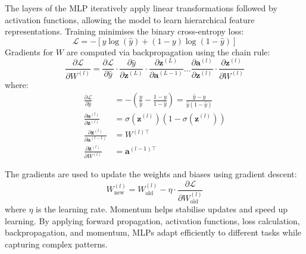 The layers of the MLP iteratively apply linear transformations followed by activation functions, allowing the model to learn hierarchical feature representations.  Training minimises the binary cross-entropy loss:
\begin{equation}
    \mathcal{L} = -\left[y \log(\hat{y}) + (1 - y) \log(1 - \hat{y})\right]
\end{equation}
Gradients for \( W \) are computed via backpropagation using the chain rule:
\begin{equation}
    \frac{\partial \mathcal{L}}{\partial W^{(l)}} = \frac{\partial \mathcal{L}}{\partial \hat{y}} \cdot \frac{\partial \hat{y}}{\partial \mathbf{z}^{(L)}} \cdot \frac{\partial \mathbf{z}^{(L)}}{\partial \mathbf{a}^{(L-1)}} \dots \frac{\partial \mathbf{a}^{(l)}}{\partial \mathbf{z}^{(l)}} \cdot \frac{\partial \mathbf{z}^{(l)}}{\partial W^{(l)}}
\end{equation}
where:
\begin{align}
    \frac{\partial \mathcal{L}}{\partial \hat{y}} &= -\left(\frac{y}{\hat{y}} - \frac{1 - y}{1 - \hat{y}}\right) = \frac{\hat{y}-y}{\hat{y}(1-\hat{y})}\\
    \frac{\partial \mathbf{a}^{(l)}}{\partial \mathbf{z}^{(l)}} &= \sigma(\mathbf{z}^{(l)})(1 - \sigma(\mathbf{z}^{(l)})) \\
    \frac{\partial \mathbf{z}^{(l)}}{\partial \mathbf{a}^{(l-1)}} &= W^{(l)\top} \\
    \frac{\partial \mathbf{z}^{(l)}}{\partial W^{(l)}} &= \mathbf{a}^{(l-1)\top}
\end{align}

The gradients are used to update the weights and biases using gradient descent:
\begin{equation}
    W_{\text{new}}^{(l)} = W_{\text{old}}^{(l)} - \eta \cdot \frac{\partial \mathcal{L}}{\partial W_{\text{old}}^{(l)}}
\end{equation}
where \( \eta \) is the learning rate. Momentum helps stabilise updates and speed up learning. By applying forward propagation, activation functions, loss calculation, backpropagation, and momentum, MLPs adapt efficiently to different tasks while capturing complex patterns.
